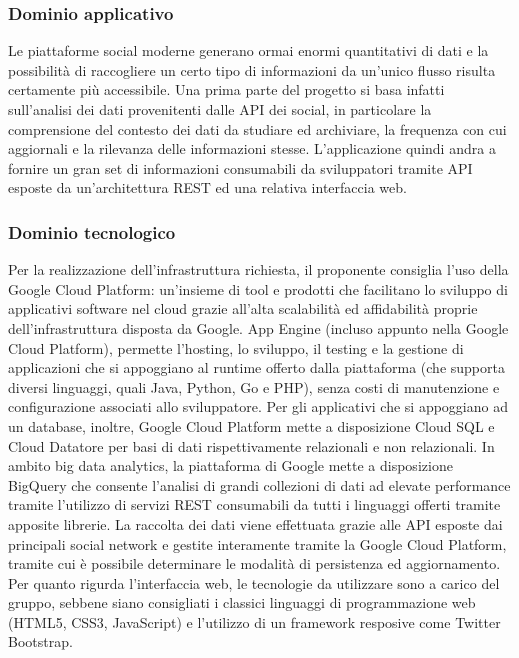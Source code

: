 \subsubsection{Dominio applicativo}
Le piattaforme social moderne generano ormai enormi quantitativi di dati e la possibilità di raccogliere un certo tipo di informazioni da un'unico flusso risulta certamente più accessibile. Una prima parte del progetto si basa infatti sull'analisi dei dati provenitenti dalle API dei social, in particolare la comprensione del contesto dei dati da studiare ed archiviare, la frequenza con cui aggiornali e la rilevanza delle informazioni stesse.
L'applicazione quindi andra a fornire un gran set di informazioni consumabili da sviluppatori tramite API esposte da un'architettura REST ed una relativa interfaccia web. 

\subsubsection{Dominio tecnologico}
Per la realizzazione dell'infrastruttura richiesta, il proponente consiglia l'uso della Google Cloud Platform: un'insieme di tool e prodotti che facilitano lo sviluppo di applicativi software nel cloud grazie all'alta scalabilità ed affidabilità proprie dell'infrastruttura disposta da Google. App Engine (incluso appunto nella Google Cloud Platform), permette l'hosting, lo sviluppo, il testing e la gestione di applicazioni che si appoggiano al runtime offerto dalla piattaforma (che supporta diversi linguaggi, quali Java, Python, Go e PHP), senza costi di manutenzione e configurazione associati allo sviluppatore. Per gli applicativi che si appoggiano ad un database, inoltre, Google Cloud Platform mette a disposizione Cloud SQL e Cloud Datatore per basi di dati rispettivamente relazionali e non relazionali. In ambito big data analytics, la piattaforma di Google mette a disposizione BigQuery che consente l'analisi di grandi collezioni di dati ad elevate performance tramite l'utilizzo di servizi REST consumabili da tutti i linguaggi offerti tramite apposite librerie.
La raccolta dei dati viene effettuata grazie alle API esposte dai principali social network e gestite interamente tramite la Google Cloud Platform, tramite cui è possibile determinare le modalità di persistenza ed aggiornamento. 
Per quanto rigurda l'interfaccia web, le tecnologie da utilizzare sono a carico del gruppo, sebbene siano consigliati i classici linguaggi di programmazione web (HTML5, CSS3, JavaScript) e l'utilizzo di un framework resposive come Twitter Bootstrap.
